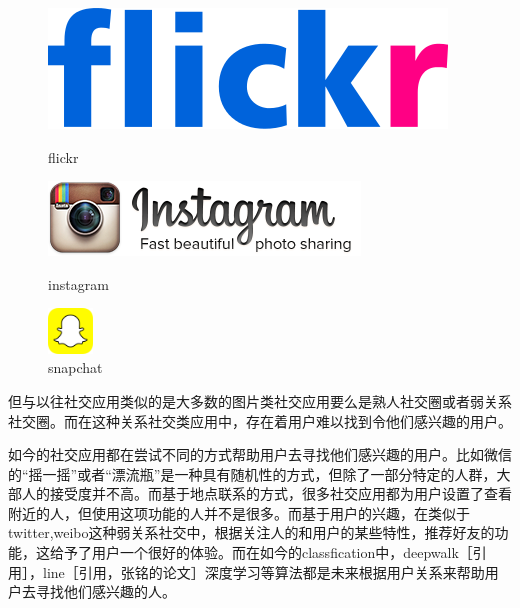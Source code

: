 \begin{figure}[h] 
\begin{minipage}[t]{0.3\linewidth}
\centering
\includegraphics[width=\textwidth]{img/chap1/flickr.png}
\caption{flickr \label{flickr}}
\end{minipage}
\hfill
\begin{minipage}[t]{0.3\linewidth}
\centering
\includegraphics[width=\textwidth]{img/chap1/instagram.png}
\caption{instagram\label{instagram}}
\end{minipage}
\begin{minipage}[t]{0.3\linewidth}
\centering
\includegraphics[width=1.2cm,height=1.2cm]{img/chap1/snapchat.png}
\caption{snapchat\label{snapchat}}
\end{minipage}

\end{figure}

但与以往社交应用类似的是大多数的图片类社交应用要么是熟人社交圈或者弱关系社交圈。而在这种关系社交类应用中，存在着用户难以找到令他们感兴趣的用户。

如今的社交应用都在尝试不同的方式帮助用户去寻找他们感兴趣的用户。比如微信的“摇一摇”或者“漂流瓶”是一种具有随机性的方式，但除了一部分特定的人群，大部人的接受度并不高。而基于地点联系的方式，很多社交应用都为用户设置了查看附近的人，但使用这项功能的人并不是很多。而基于用户的兴趣，在类似于twitter,weibo这种弱关系社交中，根据关注人的和用户的某些特性，推荐好友的功能，这给予了用户一个很好的体验。而在如今的classfication中，deepwalk［引用］，line［引用，张铭的论文］深度学习等算法都是未来根据用户关系来帮助用户去寻找他们感兴趣的人。

